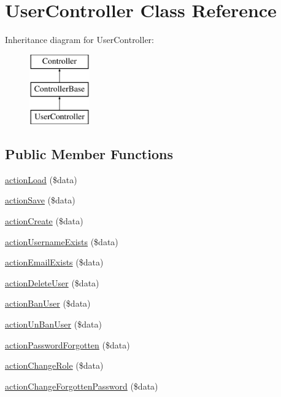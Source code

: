 \hypertarget{classUserController}{
\section{UserController Class Reference}
\label{classUserController}
}
Inheritance diagram for UserController:\begin{figure}[H]
\begin{center}
\leavevmode
\includegraphics[height=3.000000cm]{classUserController}
\end{center}
\end{figure}
\subsection*{Public Member Functions}
\begin{DoxyCompactItemize}
\item 
\hyperlink{classUserController_a7295cd724ff78bf67971bc98423405e0}{actionLoad} (\$data)
\item 
\hyperlink{classUserController_aa2eeb49ff1dbd448a986e97a72179fb5}{actionSave} (\$data)
\item 
\hyperlink{classUserController_a76cd84168a31f120db7c870d122f2270}{actionCreate} (\$data)
\item 
\hyperlink{classUserController_a68423799af006a035af5f5a7dc466166}{actionUsernameExists} (\$data)
\item 
\hyperlink{classUserController_a6a6bb3ce82990762f17460bf6b57595f}{actionEmailExists} (\$data)
\item 
\hyperlink{classUserController_af0a863a6fb8e1abb0e5830bb787c580c}{actionDeleteUser} (\$data)
\item 
\hyperlink{classUserController_a3e41d7a8100c0a094330227a872b100a}{actionBanUser} (\$data)
\item 
\hyperlink{classUserController_a4506a9975c5185621d76a163c514dbd9}{actionUnBanUser} (\$data)
\item 
\hyperlink{classUserController_a871a1c07ec9fc14a41a57d1e6268aa6d}{actionPasswordForgotten} (\$data)
\item 
\hyperlink{classUserController_ab1b1338f5cbaaaa66a8f8e2f56029b14}{actionChangeRole} (\$data)
\item 
\hyperlink{classUserController_ad0a71c9656f67576fc07b7b58b94640e}{actionChangeForgottenPassword} (\$data)
\end{DoxyCompactItemize}


